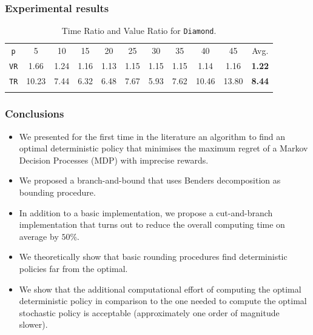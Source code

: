 \documentclass{beamer}
\begin{document}
\begin{frame}
\frametitle{Experimental results}

\begin{table}[h]																	
 \centering
 \small
 \setlength{\tabcolsep}{4.0pt}
 \renewcommand \arraystretch{1.1}
\begin{tabular}{ccccccccccc}																					
\texttt{p}	&	5	&	10	&	15	&	20	&	25	&	30	&	35	&	40	&	45	&	Avg.	\\	
\cmidrule(lr){1-1} \cmidrule(lr){2-10} \cmidrule(lr){11-11}
\texttt{VR} &	1.66	&	1.24	&	1.16	&	1.13	&	1.15	&	1.15	&	1.15	&	1.14	&	1.16	&	\textbf{1.22}	\\	
\texttt{TR} &	10.23	&	7.44	&	6.32	&	6.48	&	7.67	&	5.93	&	7.62	&	10.46	&	13.80	&	\textbf{8.44}	\\	\\
\end{tabular}
\caption{Time Ratio and Value Ratio for \texttt{Diamond}.}														\label{tab:diamond}								
\end{table}																						

\end{frame}



\begin{frame}
\frametitle{Conclusions}

\begin{itemize}
\item We presented for the first time in the literature an algorithm to find an optimal deterministic policy that minimises the maximum regret of a Markov Decision Processes (MDP) with imprecise rewards.
\item We proposed a branch-and-bound that uses Benders decomposition as bounding procedure. 
\item In addition to a basic implementation, we propose a cut-and-branch implementation that turns out to reduce the overall computing time on average by $50\%$. 
\item We theoretically show that basic rounding procedures find deterministic policies far from the optimal.
\item We show that the additional computational effort of computing the optimal deterministic policy in comparison to the one needed to compute the optimal stochastic policy is acceptable (approximately one order of magnitude slower).
\end{itemize}
\end{frame}


\end{document}
